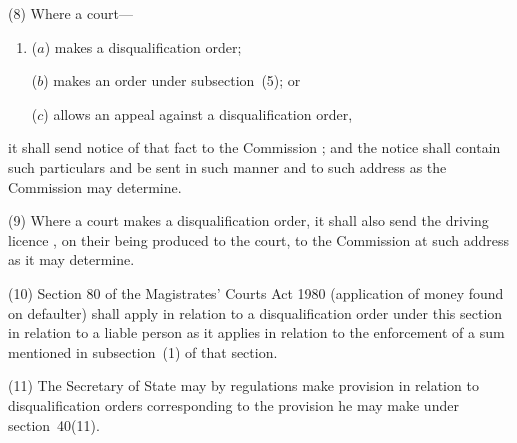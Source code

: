 \documentclass[12pt,a4paper]{article}
\begin{document}
(8) Where a court—
\begin{enumerate}\item[]
($a$) makes a disqualification order;

($b$) makes an order under subsection~(5); or

($c$) allows an appeal against a disqualification order,
\end{enumerate}
it shall send notice of that fact to the 
Commission%
; and the notice shall contain such particulars and be sent in such manner and to such address as the 
Commission  %
may determine.

(9) Where a court makes a disqualification order, it shall also send the driving licence%
, on 
their 
being produced to the court, to the 
Commission  %
at such address as 
it  %
may determine.

(10) Section 80 of the Magistrates' Courts Act 1980 (application of money found on defaulter) shall apply in relation to a disqualification order under this section in relation to a liable person as it applies in relation to the enforcement of a sum mentioned in subsection~(1)  of that section.

%
%
%

(11) The Secretary of State may by regulations make provision in relation to disqualification orders corresponding to the provision he may make under section~40(11).
\end{document}
